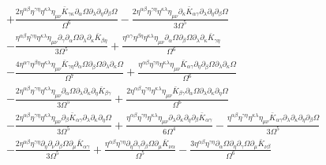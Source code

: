 \documentclass[10pt,letterpaper]{article}
\begin{document}
\begin{align}
& + \frac{2 \eta^{\alpha \beta} \eta^{\gamma \eta} \eta^{\kappa \lambda} \eta_{\mu \nu} \bar{K}_{\gamma \kappa} \partial_{\alpha}\Omega \partial_{\lambda}\partial_{\eta}\partial_{\beta}\Omega}{\Omega^6} -  \frac{2 \eta^{\alpha \beta} \eta^{\gamma \eta} \eta^{\kappa \lambda} \eta_{\mu \nu} \partial_{\kappa}\bar{K}_{\alpha \gamma} \partial_{\lambda}\partial_{\eta}\partial_{\beta}\Omega}{3 \Omega^5}\nonumber \\
& -  \frac{\eta^{\alpha \beta} \eta^{\gamma \eta} \eta^{\kappa \lambda} \eta_{\mu \nu} \partial_{\gamma}\partial_{\alpha}\Omega \partial_{\lambda}\partial_{\kappa}\bar{K}_{\beta \eta}}{3 \Omega^5} + \frac{\eta^{\alpha \gamma} \eta^{\beta \eta} \eta^{\kappa \lambda} \eta_{\mu \nu} \partial_{\alpha}\Omega \partial_{\beta}\Omega \partial_{\lambda}\partial_{\kappa}\bar{K}_{\gamma \eta}}{\Omega^6}\nonumber \\
& -  \frac{4 \eta^{\alpha \gamma} \eta^{\beta \eta} \eta^{\kappa \lambda} \eta_{\mu \nu} \bar{K}_{\gamma \eta} \partial_{\alpha}\Omega \partial_{\beta}\Omega \partial_{\lambda}\partial_{\kappa}\Omega}{\Omega^7} + \frac{\eta^{\alpha \beta} \eta^{\gamma \eta} \eta^{\kappa \lambda} \eta_{\mu \nu} \bar{K}_{\alpha \gamma} \partial_{\eta}\partial_{\beta}\Omega \partial_{\lambda}\partial_{\kappa}\Omega}{\Omega^6} \nonumber \\
&-  \frac{2 \eta^{\alpha \beta} \eta^{\gamma \eta} \eta^{\kappa \lambda} \eta_{\mu \nu} \partial_{\alpha}\Omega \partial_{\lambda}\partial_{\kappa}\partial_{\eta}\bar{K}_{\beta \gamma}}{3 \Omega^5} + \frac{2 \eta^{\alpha \beta} \eta^{\gamma \eta} \eta^{\kappa \lambda} \eta_{\mu \nu} \bar{K}_{\beta \gamma} \partial_{\alpha}\Omega \partial_{\lambda}\partial_{\kappa}\partial_{\eta}\Omega}{\Omega^6}\nonumber \\
& -  \frac{2 \eta^{\alpha \beta} \eta^{\gamma \eta} \eta^{\kappa \lambda} \eta_{\mu \nu} \partial_{\beta}\bar{K}_{\alpha \gamma} \partial_{\lambda}\partial_{\kappa}\partial_{\eta}\Omega}{3 \Omega^5} + \frac{\eta^{\alpha \beta} \eta^{\gamma \eta} \eta^{\kappa \lambda} \eta_{\mu \nu} \partial_{\lambda}\partial_{\kappa}\partial_{\eta}\partial_{\beta}\bar{K}_{\alpha \gamma}}{6 \Omega^4} -  \frac{\eta^{\alpha \beta} \eta^{\gamma \eta} \eta^{\kappa \lambda} \eta_{\mu \nu} \bar{K}_{\alpha \gamma} \partial_{\lambda}\partial_{\kappa}\partial_{\eta}\partial_{\beta}\Omega}{3 \Omega^5}\nonumber \\
& -  \frac{2 \eta^{\alpha \beta} \eta^{\gamma \eta} \partial_{\eta}\partial_{\nu}\partial_{\beta}\Omega \partial_{\mu}\bar{K}_{\alpha \gamma}}{3 \Omega^5} + \frac{\eta^{\alpha \beta} \eta^{\gamma \eta} \partial_{\eta}\partial_{\gamma}\partial_{\beta}\Omega \partial_{\mu}\bar{K}_{\nu \alpha}}{\Omega^5} -  \frac{3 \eta^{\alpha \beta} \eta^{\gamma \eta} \partial_{\alpha}\Omega \partial_{\eta}\partial_{\gamma}\Omega \partial_{\mu}\bar{K}_{\nu \beta}}{\Omega^6} \nonumber \\

\end{align}
\end{document}
